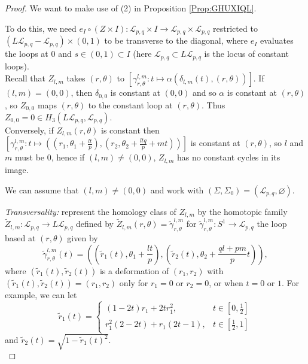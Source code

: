 \documentclass[reqno]{amsart}
\theoremstyle{definition}
\theoremstyle{remark}
\begin{document}
\begin{proof}
    We want to make use of (2) in
    Proposition \ref{Prop:GHUXIQL}.

    To do this, we need $e_I \circ \left( Z \times I \right) 
    \colon \mathcal{L}_{p,q} \times I \to 
    \mathcal{L}_{p,q} \times \mathcal{L}_{p,q}$ 
    restricted to
    $(L \mathcal{L}_{p,q} - \mathcal{L}_{p,q}) \times (0,1) $
    to be transverse
    to the diagonal, where
    $e_I$ evaluates the loops at $0$ and
    $s \in \left( 0,1 \right)  \subset I$ (here
    $\mathcal{L}_{p,q} \subset L \mathcal{L}_{p,q}$ is the
    locus of constant loops).\\
    \linebreak
    Recall that
    $Z_{l,m}$ takes
    $\left( r, \theta \right) $ to
    $\left[ \gamma_{r,\theta}^{l,m} \colon
    t\mapsto \alpha \left( \delta_{l,m}(t), (r, \theta) \right) \right] $.
    If $(l,m)= (0,0)$, then $\delta_{0,0}$ is constant
    at $(0,0)$ and so
    $\alpha$ is constant at
    $\left( r, \theta \right) $, so $Z_{0,0}$ maps
    $(r, \theta)$ to the constant loop at $(r, \theta)$. Thus
    $Z_{0,0} = 0 \in H_3 \left( L \mathcal{L}_{p,q},
    \mathcal{L}_{p,q} \right) $.\\
    \linebreak
    Conversely, if
    $Z_{l,m}(r, \theta)$ is constant then
    $\left[ \gamma_{r, \theta}^{l,m} \colon
    t \mapsto 
\left( \left( r_1, \theta_1 + \frac{lt}{p} \right) ,
\left( r_2, \theta_2 + \frac{ltq}{p} +mt \right) \right) \right] $ 
    is constant at 
    $(r, \theta)$, so $l$ and $m$ must be $0$, hence
    if $(l,m) \neq (0,0)$, $Z_{l,m}$ has no constant
    cycles in its image.

    We can assume that $(l,m) \neq (0,0)$ and work
    with $\left( \Sigma , \Sigma_0 \right) = 
    \left( \mathcal{L}_{p,q}, \varnothing \right) $.

    \textit{Transversality:} represent the homology
    class of $Z_{l,m}$ by the homotopic family
    $\tilde{Z}_{l,m} \colon \mathcal{L}_{p,q} \to 
    L \mathcal{L}_{p,q}$ defined by
    $\tilde{Z}_{l,m}(r, \theta) = 
    \tilde{\gamma}_{r,\theta}^{l,m}$ for
    $\tilde{\gamma}_{r, \theta}^{l,m} \colon S^{1} \to 
    \mathcal{L}_{p,q}$  the loop based at 
    $(r , \theta)$ given by
    \[
    \tilde{\gamma}_{r, \theta}^{l,m} (t) = 
    \left( \left( \tilde{r}_{1}(t), \theta_1 + 
    \frac{lt}{p} \right), 
    \left( \tilde{r}_{2}(t), \theta_2 + \frac{ql+pm}{p}t \right) 
\right), 
    \] 
    where $\left( \tilde{r}_1(t), \tilde{r}_2(t) \right) $ is a
    deformation of $\left( r_1,r_2 \right) $ with
    $\left( \tilde{r}_1 (t) , \tilde{r}_2(t) \right) =
    \left( r_1,r_2 \right) $ only for $r_1 = 0$ or
    $r_2 = 0$, or when $t = 0$ or $1$.
    For example, 
    we can let
    \[
    \tilde{r}_1(t) = 
    \begin{cases}
        (1-2t) r_1 + 2t r_1^2,& t \in \left[ 0,\frac{1}{2} \right] \\
        r_1^2 (2-2t) + r_1 (2t-1),& t \in \left[ \frac{1}{2},1 \right] 
    \end{cases}
    \] 
    and $\tilde{r}_2(t) = 
    \sqrt{1 - \tilde{r}_1(t)^2} $.\\
    \linebreak


\end{proof}
\end{document}
